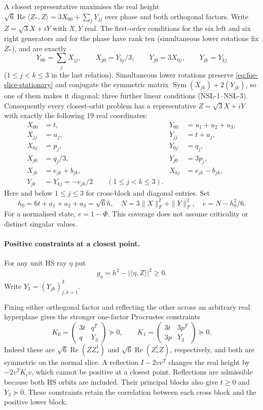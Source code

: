 A closest representative maximises the real height
$\sqrt6\operatorname{Re}\langle Z_*,Z\rangle=3X_{00}+\sum_jY_{jj}$ over phase and both orthogonal
factors. Write $Z=\sqrt3X+iY$ with $X,Y$ real. The first-order conditions for the six left
and six right generators and for the phase have rank ten (simultaneous lower rotations fix
$Z_*$), and are exactly
\begin{equation}\label{eq:fqe-slice-stationary}
 Y_{00}=\sum_{j}X_{jj},\qquad X_{j0}=Y_{0j}/3,\qquad Y_{j0}=3X_{0j},\qquad Y_{jk}=Y_{kj}
\end{equation}
($1\le j<k\le3$ in the last relation). Simultaneous lower rotations preserve
\eqref{eq:fqe-slice-stationary} and conjugate the symmetric matrix
$\operatorname{Sym}(X_{jk})+2(Y_{jk})$, so one of them makes it diagonal: three further linear
conditions (NSL-1--NSL-3).
Consequently every closest-orbit problem has a representative
$Z=\sqrt3X+iY$ with exactly the following 19 real coordinates:
\begin{align*}
 X_{00}&=t,&Y_{00}&=u_1+u_2+u_3,\\
 X_{jj}&=u_j,&Y_{jj}&=t+a_j,\\
 X_{0j}&=p_j,&Y_{0j}&=q_j,\\
 X_{j0}&=q_j/3,&Y_{j0}&=3p_j,\\
 X_{jk}&=e_{jk}+b_{jk},&X_{kj}&=e_{jk}-b_{jk},\\
 Y_{jk}&=Y_{kj}=-e_{jk}/2\qquad(1\le j<k\le3).
\end{align*}
Here and below $1\le j\le3$ for cross-block and diagonal entries.
Set
\[
 h_0=6t+a_1+a_2+a_3=\sqrt6h,\quad
 N=3\|X\|_F^2+\|Y\|_F^2,\quad e=N-h_0^2/6.
\]
For a normalised state, $e=1-\Phi$.
This coverage does not assume criticality or distinct singular values.

\paragraph{Positive constraints at a closest point.}
For any unit HS ray $\eta$ put
\[
 g_\eta=h^2-|\langle\eta,Z\rangle|^2\ge0.
\]
Write $Y_3=(Y_{jk})_{j,k=1}^3$.

Fixing either orthogonal factor and reflecting the other across an arbitrary
real hyperplane gives the stronger one-factor Procrustes constraints
\[
 K_0=\begin{pmatrix}3t&q^T\\q&Y_3\end{pmatrix}\succeq0,\qquad
 K_1=\begin{pmatrix}3t&3p^T\\3p&Y_3\end{pmatrix}\succeq0.
\]
Indeed these are $\sqrt6\operatorname{Re}(ZZ_*^\dagger)$ and
$\sqrt6\operatorname{Re}(Z_*^\dagger Z)$, respectively, and both are
symmetric on the normal slice. A reflection $I-2vv^T$ changes the real
height by $-2v^TK_i v$, which cannot be positive at a closest
point. Reflections are admissible because both HS orbits are included.
Their principal blocks also give $t\ge0$ and $Y_3\succeq0$.
These constraints retain the correlation between each cross block and
the positive lower block.

